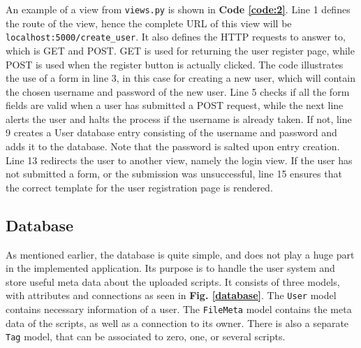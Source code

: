 \noindent An example of a view from \texttt{views.py} is shown in \textbf{Code \ref{code:2}}. Line 1 defines the route of the view, hence the complete URL of this view will be \texttt{localhost:5000/create\_user}. It also defines the HTTP requests to answer to, which is GET and POST. GET is used for returning the user register page, while POST is used when the register button is actually clicked. The code illustrates the use of a form in line 3, in this case for creating a new user, which will contain the chosen username and password of the new user. Line 5 checks if all the form fields are valid when a user has submitted a POST request, while the next line alerts the user and halts the process if the username is already taken. If not, line 9 creates a User database entry consisting of the username and password and adds it to the database. Note that the password is salted upon entry creation. Line 13 redirects the user to another view, namely the login view. If the user has not submitted a form, or the submission was unsuccessful, line 15 ensures that the correct template for the user registration page is rendered. \\


\subsection{Database}

As mentioned earlier, the database is quite simple, and does not play a huge part in the implemented application. Its purpose is to handle the user system and store useful meta data about the uploaded scripts. It consists of three models, with attributes and connections as seen in \textbf{Fig. \ref{database}}. The \texttt{User} model contains necessary information of a user. The \texttt{FileMeta} model contains the meta data of the scripts, as well as a connection to its owner. There is also a separate \texttt{Tag} model, that can be associated to zero, one, or several scripts.

